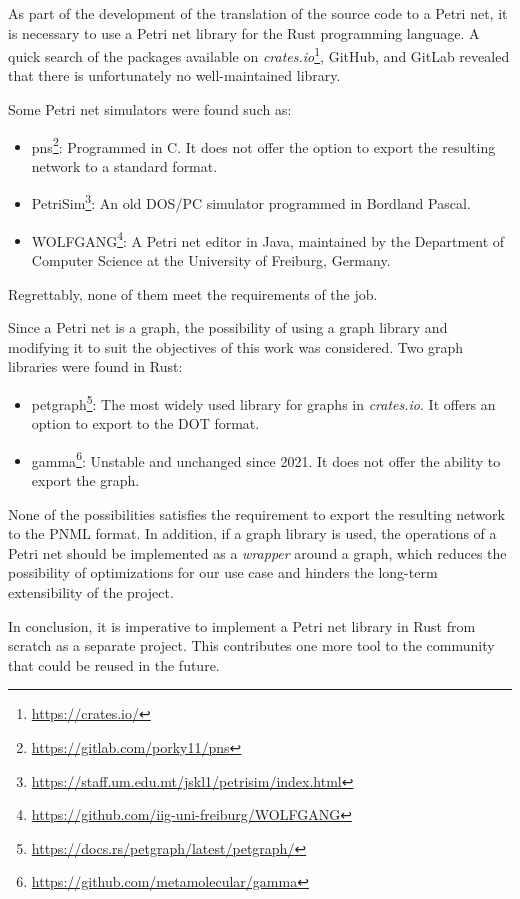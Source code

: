 \documentclass[../Thesis.tex]{subfiles}
\begin{document}
As part of the development of the translation of the source code to a Petri net,
it is necessary to use a Petri net library for the Rust programming language.
A quick search of the packages available on
\emph{crates.io}\footnote{\url{https://crates.io/}}, GitHub, and GitLab
revealed that there is unfortunately no well-maintained library.

Some Petri net simulators were found such as:

\begin{itemize}
    \item pns\footnote{\url{https://gitlab.com/porky11/pns}}:
          Programmed in C. It does not offer the option
          to export the resulting network to a standard format.
    \item PetriSim\footnote{\url{https://staff.um.edu.mt/jskl1/petrisim/index.html}}:
          An old DOS/PC simulator programmed in Bordland Pascal.
    \item WOLFGANG\footnote{\url{https://github.com/iig-uni-freiburg/WOLFGANG}}:
          A Petri net editor in Java, maintained by the Department of Computer Science
          at the University of Freiburg, Germany.
\end{itemize}

Regrettably, none of them meet the requirements of the job.

Since a Petri net is a graph, the possibility
of using a graph library and modifying it to suit the objectives of this work was considered.
Two graph libraries were found in Rust:

\begin{itemize}
    \item petgraph\footnote{\url{https://docs.rs/petgraph/latest/petgraph/}}:
          The most widely used library for graphs in \textit{crates.io}.
          It offers an option to export to the DOT format.
    \item gamma\footnote{\url{https://github.com/metamolecular/gamma}}:
          Unstable and unchanged since 2021. It does not offer the ability to export the graph.
\end{itemize}

None of the possibilities satisfies the requirement
to export the resulting network to the PNML format.
In addition, if a graph library is used,
the operations of a Petri net should be implemented as a \emph{wrapper} around a graph,
which reduces the possibility of optimizations for our use case
and hinders the long-term extensibility of the project.

In conclusion, it is imperative
to implement a Petri net library in Rust from scratch as a separate project.
This contributes one more tool to the community that could be reused in the future.
\end{document}
